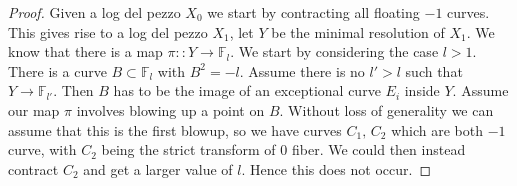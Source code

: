 \documentclass[11pt]{report}
\theoremstyle{definition}
\theoremstyle{definition}
\theoremstyle{definition}
\theoremstyle{definition}
\theoremstyle{definition}
\theoremstyle{definition}
\theoremstyle{definition}
\theoremstyle{definition}
\newcommand{\ldp}{log del pezzo }
\newcommand{\mb}[1]{\mathbb{#1}}
\begin{document}
\begin{proof}
Given a \ldp $X_0$ we start by contracting all floating $-1$ curves. This gives rise to a \ldp $X_1$, let $Y$ be the minimal resolution of $X_1$. We know that there is a map $\pi : \colon Y \rightarrow \mathbb{F}_l$. We start by considering the case $l > 1$. There is a curve $B \subset \mathbb{F}_l$ with $B^2 = -l$. Assume there is no  $l' >l$ such that $Y \rightarrow \mb{F}_{l'}$. Then $B$ has to be the image of an exceptional curve $E_i$ inside $Y$. Assume our map $\pi$ involves blowing up a point on $B$. Without loss of generality we can assume that this is the first blowup, so we have curves $C_1, \, C_2$ which are both $-1$ curve, with $C_2$ being the strict transform of $0$ fiber. We could then instead contract $C_2$ and get a larger value of $l$. Hence this does not occur. 


\end{proof}
\end{document}
